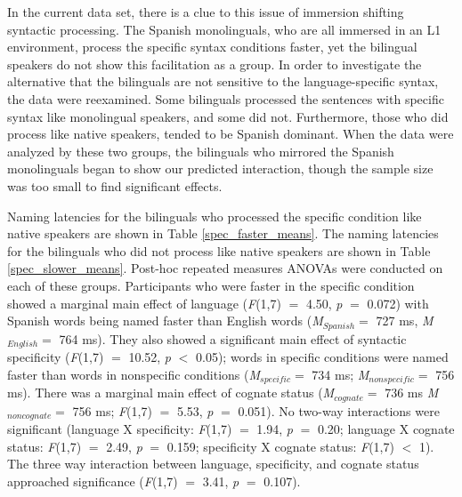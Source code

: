 In the current data set, there is a clue to this issue of immersion shifting syntactic processing. The Spanish monolinguals, who are all immersed in an L1 environment, process the specific syntax conditions faster, yet the bilingual speakers do not show this facilitation as a group. In order to investigate the alternative that the bilinguals are not sensitive to the language-specific syntax, the data were reexamined. Some bilinguals processed the sentences with specific syntax like monolingual speakers, and some did not.  Furthermore, those who did process like native speakers, tended to be Spanish dominant. When the data  were analyzed by these two groups, the bilinguals who mirrored the Spanish monolinguals began to show our predicted interaction, though the sample size was too small to find significant effects. 


Naming latencies for the bilinguals who processed the specific condition like native speakers are shown in Table \ref{spec_faster_means}. The naming latencies for the bilinguals who did not process like native speakers are shown in Table \ref{spec_slower_means}. Post-hoc repeated measures ANOVAs were  conducted on each of these groups. Participants who were faster in the specific condition showed a marginal main effect of language (\textit{F}(1,7) $=$ 4.50, \textit{p} $=$ 0.072) with Spanish words being named faster than English words (\textit{M}$_{Spanish} =$ 727 ms, \textit{M}$_{English} =$ 764 ms). They also showed a significant main effect of syntactic specificity (\textit{F}(1,7) $=$ 10.52, \textit{p} $<$ 0.05); words in specific conditions were named faster than words in nonspecific conditions (\textit{M}$_{specific} =$ 734 ms; \textit{M}$_{nonspecific} =$ 756 ms). There was a marginal main effect of cognate status (\textit{M}$_{cognate} =$ 736 ms \textit{M}$_{noncognate} =$ 756 ms; \textit{F}(1,7) $=$ 5.53, \textit{p} $=$ 0.051). No two-way interactions were significant (language X specificity: \textit{F}(1,7) $=$ 1.94, \textit{p} $=$ 0.20; language X cognate status: \textit{F}(1,7) $=$ 2.49, \textit{p} $=$ 0.159; specificity X cognate status: \textit{F}(1,7) $<$ 1). The three way interaction between language, specificity, and cognate status approached significance (\textit{F}(1,7) $=$ 3.41, \textit{p} $=$ 0.107). 

